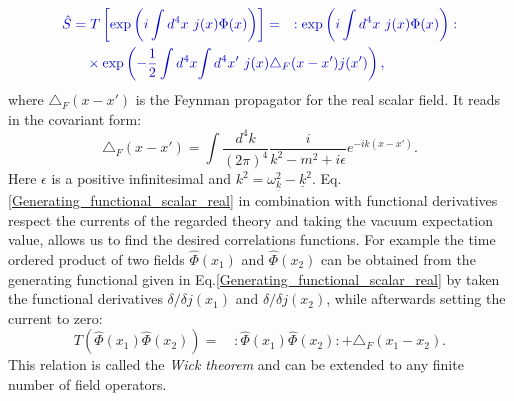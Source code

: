 \documentclass[12pt, titlepage]{article}
\begin{document}
\begin{equation}\label{Generating_functional_scalar_real} 
 \textcolor[RGB]{0,0,204}{
\begin{split}
\hat{S}&=	 T\left[
    \exp
    \left(
    i
    \int d^{4}x \ j(x) \Phi(x)
    \right)
    \right]  
   =
    \quad
:
    \exp
    \left(
    i
    \int d^{4}x \ j(x) \Phi(x)
    \right)
    : 
     \\
	& \quad \times
          \exp
    \left(
       -
            	\dfrac{1}{2}
     	\int d^{4}x
		\!     	
     	\int d^{4}x'
     	\
    j(x)
	\triangle_{F}(x-x')
    j(x')
    \right)	
 ,
\end{split}
 }
\end{equation}
where $ \triangle_{F}(x-x')$ is the Feynman propagator for the real scalar field. It reads in the covariant form:
\begin{equation}
\triangle_{F}(x-x')=\int \frac{d^{4}k}{\left( 2\pi\right)^{4}  }\frac{i}{k^{2} -m^{2} +i\epsilon} e^{-ik(x-x')}.
\end{equation}
Here $ \epsilon $ is a positive infinitesimal and $ k^{2}=\omega_{\underline{k}}^{2}-\underline{k}^{2} $.
Eq.\enskip\eqref{Generating_functional_scalar_real} in combination with functional derivatives respect the currents of the regarded theory and taking the vacuum expectation value, allows us to find the desired correlations functions. For example the time ordered product of two fields $ \hat{\Phi}(x_{1}) $ and $ \hat{\Phi}(x_{2})  $ can be obtained from the generating functional given in Eq.\enskip\eqref{Generating_functional_scalar_real} by taken the functional derivatives $\delta/\delta j(x_{1}) $ and $ \delta/\delta j(x_{2})  $, while afterwards setting the current to zero:
\begin{equation}\label{two_time_order_fields}
T\left(
\hat{\Phi}(x_{1})
\hat{\Phi}(x_{2})
 \right) =
 \quad : \hat{\Phi}(x_{1})
\hat{\Phi}(x_{2}) :  + \triangle_{F}(x_{1}-x_{2}).
\end{equation}
This relation is called the \textit{Wick theorem}  and can be extended to any finite number of field operators. %
\end{document}
